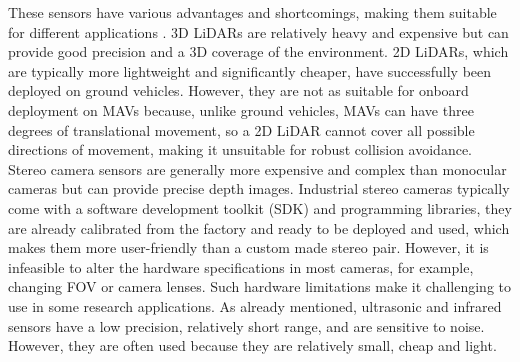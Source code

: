 These sensors have various advantages and shortcomings, making them suitable for different applications \cite{Huang2019, Aguilar2017}.
3D LiDARs are relatively heavy and expensive but can provide good precision and a 3D coverage of the environment.
2D LiDARs, which are typically more lightweight and significantly cheaper, have successfully been deployed on ground vehicles. 
However, they are not as suitable for onboard deployment on MAVs because, unlike ground vehicles, MAVs can have three degrees of translational movement, so a 2D LiDAR cannot cover all possible directions of movement, making it unsuitable for robust collision avoidance.
Stereo camera sensors are generally more expensive and complex than monocular cameras but can provide precise depth images. 
Industrial stereo cameras typically come with a software development toolkit (SDK) and programming libraries, they are already calibrated from the factory and ready to be deployed and used, which makes them more user-friendly than a custom made stereo pair. 
However, it is infeasible to alter the hardware specifications in most cameras, for example, changing FOV or camera lenses.
Such hardware limitations make it challenging to use in some research applications.
As already mentioned, ultrasonic and infrared sensors have a low precision, relatively short range, and are sensitive to noise.
However, they are often used because they are relatively small, cheap and light.

